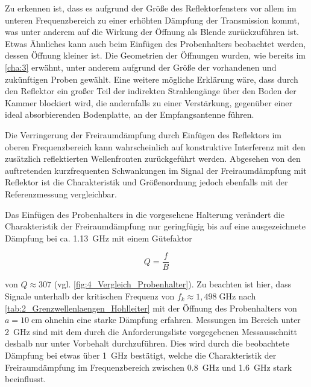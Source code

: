 Zu erkennen ist, dass es aufgrund der Größe des Reflektorfensters vor allem im unteren Frequenzbereich zu einer erhöhten Dämpfung der Transmission kommt, was unter anderem auf die Wirkung der Öffnung als Blende zurückzuführen ist. Etwas Ähnliches kann auch beim Einfügen des Probenhalters beobachtet werden, dessen Öffnung kleiner ist. Die Geometrien der Öffnungen wurden, wie bereits im \Kapitel\ref{cha:3} erwähnt, unter anderem aufgrund der Größe der vorhandenen und zukünftigen Proben gewählt. Eine weitere mögliche Erklärung wäre, dass durch den Reflektor ein großer Teil der indirekten Strahlengänge über den Boden der Kammer blockiert wird, die andernfalls zu einer Verstärkung, gegenüber einer ideal absorbierenden Bodenplatte, an der Empfangsantenne führen. 
\par
\vspace{\linespace}
Die Verringerung der Freiraumdämpfung durch Einfügen des Reflektors im oberen Frequenzbereich kann wahrscheinlich auf konstruktive Interferenz mit den zusätzlich reflektierten Wellenfronten zurück\-geführt werden. Abgesehen von den auftretenden kurzfrequenten Schwankungen im Signal der Freiraum\-dämpfung mit Reflektor ist die Charakteristik und Größenordnung jedoch ebenfalls mit der Referenzmessung vergleichbar.
\par
\vspace{\linespace}
Das Einfügen des Probenhalters in die vorgesehene Halterung verändert die Charakteristik der Freiraumdämpfung nur geringfügig bis auf eine ausgezeichnete Dämpfung bei ca. \SI{1,13}{\giga\hertz} mit einem Gütefaktor

\begin{equation}
    Q = \frac{f}{B}
\end{equation}

von $Q \approx 307$ (vgl. \Abb\ref{fig:4_Vergleich_Probenhalter}). Zu beachten ist hier, dass Signale unterhalb der kritischen Frequenz von $f_k \approx 1,498\;\si{\giga\hertz}$ nach \Tabelle\ref{tab:2_Grenzwellenlaengen_Hohlleiter} mit der Öffnung des Probenhalters von $a = 10\;\si{\centi\meter}$ ohnehin eine starke Dämpfung erfahren. Messungen im Bereich unter \SI{2}{\giga\hertz} sind mit dem durch die Anforderungsliste vorgegebenen Messausschnitt deshalb nur unter Vorbehalt durchzuführen. Dies wird durch die beobachtete Dämpfung bei etwas über \SI{1}{\giga\hertz} bestätigt, welche die Charakteristik der Freiraumdämpfung im Frequenzbereich zwischen \SI{0.8}{\giga\hertz} und \SI{1.6}{\giga\hertz} stark beeinflusst. %
\par
\vspace{\linespace}

